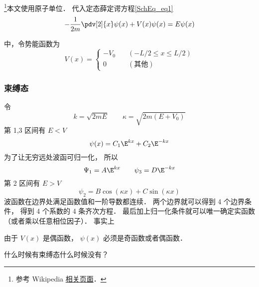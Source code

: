 




\footnote{参考 Wikipedia \href{https://en.wikipedia.org/wiki/Finite_potential_well}{相关页面}．}本文使用原子单位． 代入定态薛定谔方程\autoref{SchEq_eq1}~
\begin{equation}
-\frac{1}{2m}\pdv[2]{x}\psi(x) + V(x) \psi(x) = E \psi(x)
\end{equation}

中，令势能函数为
\begin{equation}
V(x) = \begin{cases}
-V_0 \quad &(-L/2 \leqslant x \leqslant L/2)\\
0 \quad &(\text{其他})
\end{cases}
\end{equation}



\subsubsection{束缚态}
令
\begin{equation}
k = \sqrt{2mE} \qquad \kappa = \sqrt{2m(E + V_0)}
\end{equation}
第 1,3 区间有 $E < V$
\begin{equation}
\psi(x) = C_1 \E^{kx} + C_2 \E^{-kx}
\end{equation}
为了让无穷远处波函可归一化， 所以
\begin{equation}
\Psi_1 = A \E^{kx} \qquad \psi_3 = D\E^{-kx}
\end{equation}
第 2 区间有 $E > V$
\begin{equation}
\psi_2 = B \cos(\kappa x) + C\sin(\kappa x)
\end{equation}
波函数在边界处满足函数值和一阶导数都连续． 两个边界就可以得到 4 个边界条件， 得到 4 个系数的 4 条齐次方程． 最后加上归一化条件就可以唯一确定实函数（或者乘以任意相位因子）． 事实上


由于 $V(x)$ 是偶函数， $\psi(x)$ 必须是奇函数或者偶函数．




什么时候有束缚态什么时候没有？
